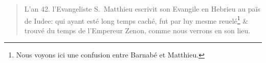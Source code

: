 \begin{quotation}
L'an 42. l'Evangeliste S.~Matthieu escrivit son Evangile en Hebrieu au païs de Iudee: qui ayant esté long temps caché, fut par luy mesme reuelé\footnote{Nous voyons ici une confusion entre Barnabé et Matthieu.} \& trouvé du temps de l'Empereur Zenon, comme nous verrons en son lieu.
\end{quotation}